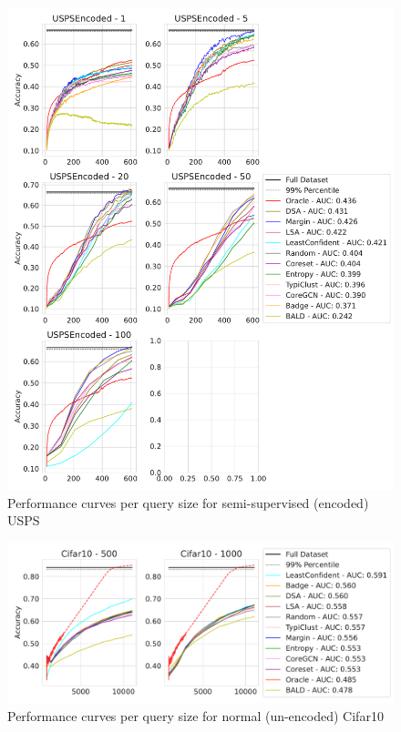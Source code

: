 \documentclass[]{article}
\begin{document}
\begin{figure}[H]
    \centering
    \caption{Performance curves per query size for semi-supervised (encoded) USPS}
    \includegraphics[width=\linewidth]{img/eval_usps_enc}
\end{figure}
\begin{figure}[H]
    \centering
    \caption{Performance curves per query size for normal (un-encoded) Cifar10}
    \includegraphics[width=\linewidth]{img/eval_cifar10}
\end{figure}
\end{document}
